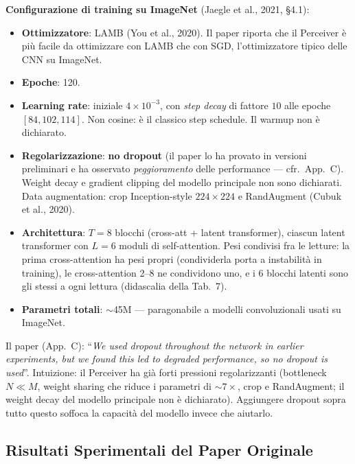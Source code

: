 \documentclass[
  11pt,
]{article}
\begin{document}
\textbf{Configurazione di training su ImageNet} (Jaegle et al., 2021, \S4.1):
\begin{itemize}
\item \textbf{Ottimizzatore}: LAMB (You et al., 2020). Il paper riporta che il Perceiver è più facile da ottimizzare con LAMB che con SGD, l'ottimizzatore tipico delle CNN su ImageNet.
\item \textbf{Epoche}: 120.
\item \textbf{Learning rate}: iniziale $4 \times 10^{-3}$, con \emph{step decay} di fattore $10$ alle epoche $[84, 102, 114]$. Non cosine: è il classico step schedule. Il warmup non è dichiarato.
\item \textbf{Regolarizzazione}: \textbf{no dropout} (il paper lo ha provato in versioni preliminari e ha osservato \emph{peggioramento} delle performance --- cfr.\ App.\ C). Weight decay e gradient clipping del modello principale non sono dichiarati. Data augmentation: crop Inception-style $224\times224$ e RandAugment (Cubuk et al., 2020).
\item \textbf{Architettura}: $T = 8$ blocchi (cross-att + latent transformer), ciascun latent transformer con $L = 6$ moduli di self-attention. Pesi condivisi fra le letture: la prima cross-attention ha pesi propri (condividerla porta a instabilità in training), le cross-attention 2--8 ne condividono uno, e i 6 blocchi latenti sono gli stessi a ogni lettura (didascalia della Tab.~7).
\item \textbf{Parametri totali}: $\sim$45M --- paragonabile a modelli convoluzionali usati su ImageNet.
\end{itemize}

\begin{notabox}[title={\textbf{Perché no dropout?}}]
Il paper (App.\ C): ``\emph{We used dropout throughout the network in earlier experiments, but we found this led to degraded performance, so no dropout is used}''. Intuizione: il Perceiver ha già forti pressioni regolarizzanti (bottleneck $N \ll M$, weight sharing che riduce i parametri di $\sim7\times$, crop e RandAugment; il weight decay del modello principale non è dichiarato). Aggiungere dropout sopra tutto questo soffoca la capacità del modello invece che aiutarlo.
\end{notabox}

\subsection{Risultati Sperimentali del Paper Originale}
\label{sec:results}
\end{document}
